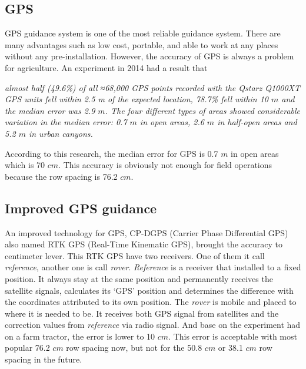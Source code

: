 \documentclass[letterpaper,12pt,oneside]{book}
\begin{document}
		\subsection{GPS}
		GPS guidance system is one of the most reliable guidance system. There are many advantages such as low cost, portable, and able to work at any places without any pre-installation. However, the accuracy of GPS is always a problem for agriculture. An experiment in 2014 had a result that 
		\begin{adjustwidth}{0.5 in}{}
			\textit{almost half (49.6\%) of all ≈68,000 GPS points recorded with the Qstarz Q1000XT GPS units fell within 2.5 m of the expected location, 78.7\% fell within 10 $m$ and the median error was 2.9 $m$. The four different types of areas showed considerable variation in the median error: 0.7 $m$ in open areas, 2.6 $m$ in half-open areas and 5.2 $m$ in urban canyons.} \cite{schipperijn2014dynamic}
		\end{adjustwidth}
		According to this research, the median error for GPS is 0.7 $m$ in open areas which is 70 $cm$. This accuracy is obviously not enough for field operations because the row spacing is 76.2 $cm$.
		
		\subsection{Improved GPS guidance}
		An improved technology for GPS, CP-DGPS (Carrier Phase Differential GPS) also named RTK GPS (Real-Time Kinematic GPS), brought the accuracy to centimeter lever. This RTK GPS have two receivers. One of them it call \textit{reference}, another one is call \textit{rover}. \textit{Reference} is a receiver that installed to a fixed position. It always stay at the same position and permanently receives the satellite signals, calculates its ‘GPS’ position and determines the difference with the coordinates attributed to its own position. The \textit{rover} is mobile and placed to where it is needed to be. It receives both GPS signal from satellites and the correction values from \textit{reference} via radio signal. \cite{lambiel2004contribution} And base on the experiment had on a farm tractor, the error is lower to 10 $cm$. \cite{thuilot2002automatic} This error is acceptable with most popular 76.2 $cm$ row spacing now, but not for the 50.8 $cm$ or 38.1 $cm$ row spacing in the future. \cite{fawcett2014farm} 
		
\end{document}

